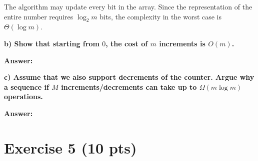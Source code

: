 \documentclass[a4paper]{article}
\begin{document}
The algorithm may update every bit in the array. Since the representation of the entire number requires $\log_2 m$ bits, the complexity in the worst case is $\Theta(\log m)$.

\bigskip \noindent \textbf{b) Show that starting from $0$, the cost of $m$ increments is $O(m)$.}



\bigskip \noindent \textbf{Answer:}

\bigskip \noindent \textbf{c) Assume that we also support decrements of the counter. Argue why a sequence if $M$ increments/decrements can take up to $\Omega(m \log m)$ operations.}

\bigskip \noindent \textbf{Answer:}


\bigskip

\section{Exercise 5 (10 pts)}
\end{document}
